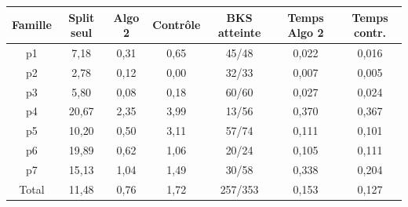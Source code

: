 \begin{tabular}{|c|c|c|c|c|c|c|}
\hline
\textbf{Famille} & \textbf{Split seul} & \textbf{Algo 2} & \textbf{Contrôle} & \textbf{BKS atteinte} & \textbf{Temps Algo 2} & \textbf{Temps contr.} \\
\hline
p1 & 7{,}18 & 0{,}31 & 0{,}65 & 45/48 & 0{,}022 & 0{,}016 \\
\hline
p2 & 2{,}78 & 0{,}12 & 0{,}00 & 32/33 & 0{,}007 & 0{,}005 \\
\hline
p3 & 5{,}80 & 0{,}08 & 0{,}18 & 60/60 & 0{,}027 & 0{,}024 \\
\hline
p4 & 20{,}67 & 2{,}35 & 3{,}99 & 13/56 & 0{,}370 & 0{,}367 \\
\hline
p5 & 10{,}20 & 0{,}50 & 3{,}11 & 57/74 & 0{,}111 & 0{,}101 \\
\hline
p6 & 19{,}89 & 0{,}62 & 1{,}06 & 20/24 & 0{,}105 & 0{,}111 \\
\hline
p7 & 15{,}13 & 1{,}04 & 1{,}49 & 30/58 & 0{,}338 & 0{,}204 \\
\hline
\hline
Total & 11{,}48 & 0{,}76 & 1{,}72 & 257/353 & 0{,}153 & 0{,}127 \\
\hline
\end{tabular}
